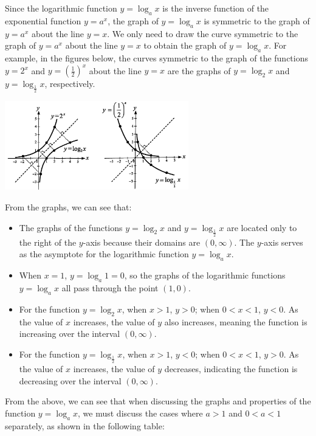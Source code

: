 \documentclass{report}
\begin{document}
Since the logarithmic function $y=\log _a x$ is the inverse function of the exponential function $y=a^x$, the graph of $y=\log _a x$ is symmetric to the graph of $y=a^x$ about the line $y=x$. We only need to draw the curve symmetric to the graph of $y=a^x$ about the line $y=x$ to obtain the graph of $y=\log _a x$. For example, in the figures below, the curves symmetric to the graph of the functions $y=2^x$ and $y=\left(\frac{1}{2}\right)^x$ about the line $y=x$ are the graphs of $y=\log _2 x$ and $y=\log _{\frac{1}{2}} x$, respectively.
\begin{center}
	\includegraphics[width=0.6\textwidth]{assets/12-5.png}
\end{center}

From the graphs, we can see that:
\begin{itemize}
	\item The graphs of the functions $y=\log _2 x$ and $y=\log _{\frac{1}{2}} x$ are located only to the right of the $y$-axis because their domains are $(0, \infty)$.
	      The $y$-axis serves as the asymptote for the logarithmic function $y=\log _a x$.
	\item When $x=1$, $y=\log _a 1=0$, so the graphs of the logarithmic functions $y=\log _a x$ all pass through the point $(1,0)$.
	\item For the function $y=\log _2 x$, when $x>1$, $y>0$; when $0<x<1$, $y<0$. As the value of $x$ increases, the value of $y$ also increases, meaning the function is increasing over the interval $(0, \infty)$.
	\item For the function $y=\log _{\frac{1}{2}} x$, when $x>1$, $y<0$; when $0<x<1$, $y>0$. As the value of $x$ increases, the value of $y$ decreases, indicating the function is decreasing over the interval $(0, \infty)$.
\end{itemize}

From the above, we can see that when discussing the graphs and properties of the function $y=\log _a x$, we must discuss the cases where $a > 1$ and $0 < a < 1$ separately, as shown in the following table:
\end{document}
